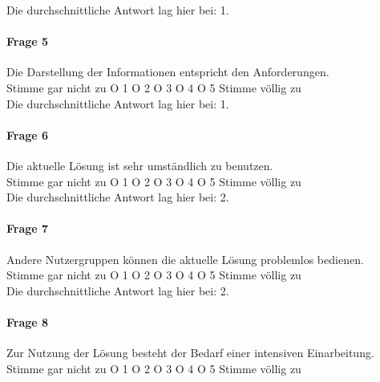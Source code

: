 \noindent Die durchschnittliche Antwort lag hier bei: 1. \\


\paragraph{Frage 5} Die Darstellung der Informationen entspricht den Anforderungen. \\ 


\noindent Stimme gar nicht zu { }{ } O 1 { }{ } O 2 { }{ } O 3 { }{ } O 4 { }{ } O 5 { }{ } Stimme völlig zu \\


\noindent Die durchschnittliche Antwort lag hier bei: 1. \\


\paragraph{Frage 6} Die aktuelle Lösung ist sehr umständlich zu benutzen. \\ 


\noindent Stimme gar nicht zu { }{ } O 1 { }{ } O 2 { }{ } O 3 { }{ } O 4 { }{ } O 5 { }{ } Stimme völlig zu \\


\noindent Die durchschnittliche Antwort lag hier bei: 2. \\


\paragraph{Frage 7} Andere Nutzergruppen können die aktuelle Lösung problemlos bedienen. \\ 


\noindent Stimme gar nicht zu { }{ } O 1 { }{ } O 2 { }{ } O 3 { }{ } O 4 { }{ } O 5 { }{ } Stimme völlig zu \\


\noindent Die durchschnittliche Antwort lag hier bei: 2. \\


\paragraph{Frage 8} Zur Nutzung der Lösung besteht der Bedarf einer intensiven Einarbeitung. \\ 


\noindent Stimme gar nicht zu { }{ } O 1 { }{ } O 2 { }{ } O 3 { }{ } O 4 { }{ } O 5 { }{ } Stimme völlig zu \\


